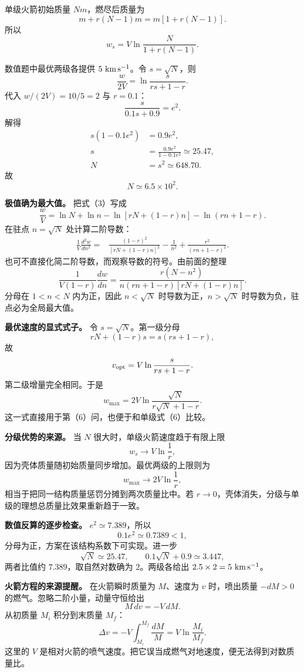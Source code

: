 \documentclass[12pt,a4paper,UTF8]{ctexart}
\begin{document}
单级火箭初始质量 \(Nm\)，燃尽后质量为 \[
m+r(N-1)m=m[1+r(N-1)].
\] 所以 \[
\boxed{
w_s=V\ln\frac{N}{1+r(N-1)}
}. \tag{6}
\]

数值题中最优两级各提供 \(5\ {\rm km\,s^{-1}}\)。令 \(s=\sqrt N\)，则 \[
\frac{w}{2V}
=\ln\frac{s}{rs+1-r}.
\] 代入 \(w/(2V)=10/5=2\) 与 \(r=0.1\)： \[
\frac{s}{0.1s+0.9}=e^2.
\] 解得 \[
\begin{aligned}
s(1-0.1e^2)&=0.9e^2,\\
s&=\frac{0.9e^2}{1-0.1e^2}\simeq25.47,\\
N&=s^2\simeq648.70.
\end{aligned}
\] 故 \[
\boxed{N\simeq6.5\times10^2}. \tag{7}
\]

\textbf{极值确为最大值。} 把式（3）写成 \[
\frac wV=\ln N+\ln n
-\ln[rN+(1-r)n]
-\ln(rn+1-r).
\] 在驻点 \(n=\sqrt N\) 处计算二阶导数： \[
\begin{aligned}
\frac1V\frac{d^2w}{dn^2}
={}&\frac{(1-r)^2}{[rN+(1-r)n]^2}
-\frac1{n^2}
+\frac{r^2}{(rn+1-r)^2}.
\end{aligned}
\] 也可不直接化简二阶导数，而观察导数的符号。由前面的整理 \[
\frac1{V(1-r)}\frac{dw}{dn}
=\frac{r(N-n^2)}
{n(rn+1-r)[rN+(1-r)n]}.
\tag{8}
\] 分母在 \(1<n<N\) 内为正，因此 \(n<\sqrt N\) 时导数为正，\(n>\sqrt N\)
时导数为负，驻点必为全局最大值。

\textbf{最优速度的显式式子。} 令 \(s=\sqrt N\)。第一级分母 \[
rN+(1-r)s=s(rs+1-r),
\] 故 \[
v_{\rm opt}
=V\ln\frac{s}{rs+1-r}.
\] 第二级增量完全相同。于是 \[
\boxed{
w_{\max}=2V\ln\frac{\sqrt N}
{r\sqrt N+1-r}
}. \tag{9}
\] 这一式直接用于第（6）问，也便于和单级式（6）比较。

\textbf{分级优势的来源。} 当 \(N\) 很大时，单级火箭速度趋于有限上限 \[
w_s\to V\ln\frac1r,
\] 因为壳体质量随初始质量同步增加。最优两级的上限则为 \[
w_{\max}\to2V\ln\frac1r,
\] 相当于把同一结构质量惩罚分摊到两次质量比中。若
\(r\to0\)，壳体消失，分级与单级的理想总质量比效果重新趋于一致。

\textbf{数值反算的逐步检查。} \(e^2\simeq7.389\)，所以 \[
0.1e^2\simeq0.7389<1,
\] 分母为正，方案在该结构系数下可实现。进一步 \[
\sqrt N\simeq25.47,\qquad
0.1\sqrt N+0.9\simeq3.447,
\] 两者比值约 \(7.389\)，取自然对数确为 \(2\)。两级各给出
\(2.5\times2=5\ {\rm km\,s^{-1}}\)。

\textbf{火箭方程的来源提醒。} 在火箭瞬时质量为 \(M\)、速度为 \(v\)
时，喷出质量 \(-dM>0\) 的燃气。忽略二阶小量，动量守恒给出 \[
M\,dv=-V\,dM.
\] 从初质量 \(M_i\) 积分到末质量 \(M_f\)： \[
\Delta v=-V\int_{M_i}^{M_f}\frac{dM}{M}
=V\ln\frac{M_i}{M_f}.
\] 这里的 \(V\)
是相对火箭的喷气速度。把它误当成燃气对地速度，便无法得到对数质量比。
\end{document}
